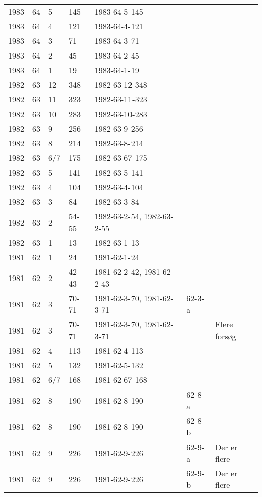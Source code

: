 \begin{longtable}{ |l|l|l|l|p{2.7cm}|l|p{2cm}| }
 1983 & 64 &     5 &   145   & 1983-64-5-145  &  & \\
 1983 & 64 &     4 &    121  & 1983-64-4-121  &  & \\
 1983 & 64 &     3 &     71  & 1983-64-3-71   &  & \\
 1983 & 64 &     2 &    45   & 1983-64-2-45   &  & \\
 1983 & 64 &     1 &    19   & 1983-64-1-19   &  & \\
 1982 & 63 &    12 &   348   & 1982-63-12-348 &  & \\
 1982 & 63 &    11 &   323   & 1982-63-11-323 &  & \\
 1982 & 63 &    10 &   283   & 1982-63-10-283 &  & \\
 1982 & 63 &     9 &   256   & 1982-63-9-256  &  & \\
 1982 & 63 &     8 &   214   & 1982-63-8-214  &  & \\
 1982 & 63 &   6/7 &   175   & 1982-63-67-175 &  & \\
 1982 & 63 &     5 &   141   & 1982-63-5-141  &  & \\
 1982 & 63 &     4 &   104   & 1982-63-4-104  &  & \\
 1982 & 63 &     3 &   84    & 1982-63-3-84   &  & \\
 1982 & 63 &     2 &  54-55  & 1982-63-2-54, 1982-63-2-55  &  & \\
 1982 & 63 &     1 &   13    & 1982-63-1-13   &  & \\
 1981 & 62 &     1 &      24 &   1981-62-1-24 &  & \\
 1981 & 62 &     2 &   42-43 & 1981-62-2-42, 1981-62-2-43 &  & \\
 1981 & 62 &     3 &   70-71 & 1981-62-3-70, 1981-62-3-71 & 62-3-a & \\
 1981 & 62 &   3 &   70-71 & 1981-62-3-70, 1981-62-3-71 &  & Flere forsøg \\
 1981 & 62 &     4 &     113 &  1981-62-4-113 &  & \\
 1981 & 62 &     5 &     132 &  1981-62-5-132 &  & \\
 1981 & 62 &   6/7 &     168 & 1981-62-67-168 &  & \\
 1981 & 62 &     8 &     190 &  1981-62-8-190 & 62-8-a & \\
 1981 & 62 &     8 &     190 &  1981-62-8-190 & 62-8-b & \\
 1981 & 62 &     9 &     226 &  1981-62-9-226 &  62-9-a & Der er flere \\
 1981 & 62 &     9 &     226 &  1981-62-9-226 &  62-9-b & Der er flere \\

\end{longtable}
